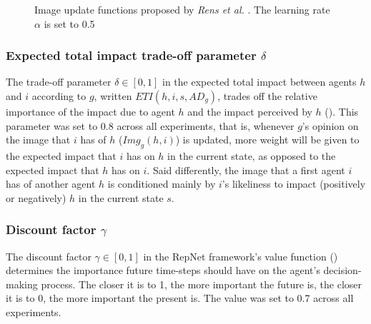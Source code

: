 \begin{figure}[h]
\caption{Image update functions proposed by \textit{Rens et al.} \cite{rensetal}. The learning rate $\alpha$ is set to 0.5}
\label{fig:upd}
\end{figure}

\subsubsection{Expected total impact trade-off parameter $\delta$}
The trade-off parameter $\delta \in [0,1]$ in the expected total impact between agents $h$ and $i$ according to $g$, written $ETI(h,i,s,AD_g)$, trades off the relative importance of the impact due to agent $h$ and the impact perceived by $h$ (). This parameter was set to $0.8$ across all experiments, that is, whenever $g$'s opinion on the image that $i$ has of $h$ ($Img_g(h,i)$) is updated, more weight will be given to the expected impact that $i$ has on $h$ in the current state, as opposed to the expected impact that $h$ has on $i$. Said differently, the image that a first agent $i$ has of another agent $h$ is conditioned mainly by $i$'s likeliness to impact (positively or negatively) $h$ in the current state $s$.

\subsubsection{Discount factor $\gamma$}
The discount factor $\gamma \in [0,1]$ in the RepNet framework's value function () determines the importance future time-steps should have on the agent's decision-making process. The closer it is to 1, the more important the future is, the closer it is to 0, the more important the present is. The value was set to 0.7 across all experiments.

